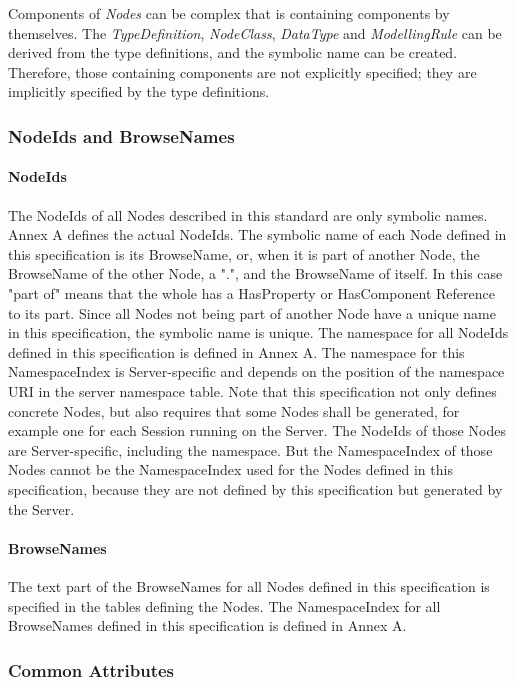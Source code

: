 Components of \textit{Nodes} can be complex that is containing components by themselves. The \textit{TypeDefinition}, \textit{NodeClass}, \textit{DataType} and \textit{ModellingRule} can be derived from the type definitions, and the symbolic name can be created. Therefore, those containing components are not explicitly specified; they are implicitly specified by the type definitions.

\subsubsection{NodeIds and BrowseNames}

\paragraph{NodeIds}

The NodeIds of all Nodes described in this standard are only symbolic names. Annex A defines the actual NodeIds.
The symbolic name of each Node defined in this specification is its BrowseName, or, when it is part of another Node, the BrowseName of the other Node, a ".", and the BrowseName of itself. In this case "part of" means that the whole has a HasProperty or HasComponent Reference to its part. Since all Nodes not being part of another Node have a unique name in this specification, the symbolic name is unique.
The namespace for all NodeIds defined in this specification is defined in Annex A. The namespace for this NamespaceIndex is Server-specific and depends on the position of the namespace URI in the server namespace table.
Note that this specification not only defines concrete Nodes, but also requires that some Nodes shall be generated, for example one for each Session running on the Server. The NodeIds of those Nodes are Server-specific, including the namespace. But the NamespaceIndex of those Nodes cannot be the NamespaceIndex used for the Nodes defined in this specification, because they are not defined by this specification but generated by the Server.

\paragraph{BrowseNames}
The text part of the BrowseNames for all Nodes defined in this specification is specified in the tables defining the Nodes. The NamespaceIndex for all BrowseNames defined in this specification is defined in Annex A.

\subsubsection{Common Attributes}

